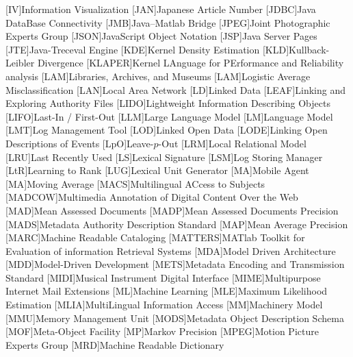 [IV]{Information Visualization}
[JAN]{Japanese Article Number}
[JDBC]{Java DataBase Connectivity}
[JMB]{Java--Matlab Bridge}
[JPEG]{Joint Photographic Experts Group}
[JSON]{JavaScript Object Notation}
[JSP]{Java Server Pages}
[JTE]{Java-Treceval Engine}
[KDE]{Kernel Density Estimation}
[KLD]{Kullback-Leibler Divergence}
[KLAPER]{Kernel LAnguage for PErformance and Reliability analysis}
[LAM]{Libraries, Archives, and Museums}
[LAM]{Logistic Average Misclassification}
[LAN]{Local Area Network}
[LD]{Linked Data}
[LEAF]{Linking and Exploring Authority Files}
[LIDO]{Lightweight Information Describing Objects}
[LIFO]{Last-In / First-Out}
[LLM]{Large Language Model}
[LM]{Language Model}
[LMT]{Log Management Tool}
[LOD]{Linked Open Data}
[LODE]{Linking Open Descriptions of Events}
[LpO]{Leave-$p$-Out}
[LRM]{Local Relational Model}
[LRU]{Last Recently Used}
[LS]{Lexical Signature}
[LSM]{Log Storing Manager}
[LtR]{Learning to Rank}
[LUG]{Lexical Unit Generator}
[MA]{Mobile Agent}
[MA]{Moving Average}
[MACS]{Multilingual ACcess to Subjects}
[MADCOW]{Multimedia Annotation of Digital Content Over the Web}
[MAD]{Mean Assessed Documents}
[MADP]{Mean Assessed Documents Precision}
[MADS]{Metadata Authority Description Standard}
[MAP]{Mean Average Precision}
[MARC]{Machine Readable Cataloging}
[MATTERS]{MATlab Toolkit for Evaluation of information Retrieval Systems}
[MDA]{Model Driven Architecture}
[MDD]{Model-Driven Development}
[METS]{Metadata Encoding and Transmission Standard}
[MIDI]{Musical Instrument Digital Interface}
[MIME]{Multipurpose Internet Mail Extensions}
[ML]{Machine Learning}
[MLE]{Maximum Likelihood Estimation}
[MLIA]{MultiLingual Information Access}
[MM]{Machinery Model}
[MMU]{Memory Management Unit}
[MODS]{Metadata Object Description Schema}
[MOF]{Meta-Object Facility}
[MP]{Markov Precision}
[MPEG]{Motion Picture Experts Group}
[MRD]{Machine Readable Dictionary}
